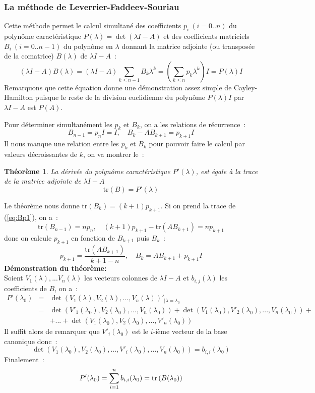 \documentclass[a4paper,11pt]{article}
\newtheorem{thm}{Théorème}
\newcommand{\tr}{\mbox{tr\,}}
\begin{document}
\begin{giacjshere}
\subsubsection{La m\'ethode de
  Leverrier-Faddeev-Souriau} 
Cette m\'ethode permet le calcul simultan\'e des coefficients 
$p_i \ (i=0..n)$ du polyn\^ome caract\'eristique 
$P(\lambda)=\det(\lambda I-A)$  et des coefficients matriciels
$B_i \ (i=0..n-1)$ du polyn\^ome en $\lambda$ donnant la matrice adjointe
(ou transpos\'ee de la comatrice) $B(\lambda)$ de $\lambda I -A$~:
\begin{equation} \label{eq:Bp}
 (\lambda I -A)B(\lambda)=(\lambda I -A) \sum_{k\leq n-1} B_k \lambda^k
= (\sum_{k\leq n} p_k \lambda^k)I =P(\lambda)I
\end{equation}
Remarquons que cette équation donne une démonstration assez simple
de Cayley-Hamilton puisque le reste de la division euclidienne
du polynôme $P(\lambda)I$ par $\lambda I -A $ est $P(A)$.

Pour déterminer simultanément les $p_k$ et $B_k$,
on a les relations de récurrence~:
\begin{equation}
\label{eq:Bp1} B_{n-1}=p_n I=I, \quad B_k-AB_{k+1}=p_{k+1} I
\end{equation}
Il nous manque une relation entre les $p_k$ et $B_k$ pour pouvoir
faire le calcul par valeurs décroissantes de $k$, on va montrer le~:
\begin{thm}
La d\'eriv\'ee  du polyn\^ome caract\'eristique $P'(\lambda)$,
est \'egale \`a la trace de la matrice adjointe 
de $\lambda I-A$
\[ \mbox{tr}(B)=P'(\lambda) \]
\end{thm}
Le théorème nous donne $\mbox{tr}(B_k) = (k+1)p_{k+1} $.
Si on prend la trace de (\ref{eq:Bp1}), on a~:
\[ \mbox{tr}(B_{n-1})=n p_n, \quad (k+1)p_{k+1} -\mbox{tr}(AB_{k+1})
=np_{k+1} \]
donc on calcule $p_{k+1}$ en fonction de $B_{k+1}$ puis $B_k$~:
\[ p_{k+1}=\frac{\mbox{tr}(AB_{k+1})}{k+1-n}, 
\quad B_k=AB_{k+1}+p_{k+1} I \]
{\bf D\'emonstration du théorème:}\\
Soient $V_1(\lambda),...V_n(\lambda)$ les vecteurs colonnes 
de $\lambda I-A$ et $b_{i,j}(\lambda)$ les coefficients de $B$, on a~:
\begin{eqnarray*}
P'(\lambda_0) &=& \det(V_1(\lambda),V_2(\lambda),...,V_n(\lambda) )'
_{|\lambda=\lambda_0}\\
&=&\det(V'_1(\lambda_0),V_2(\lambda_0),...,V_n(\lambda_0) )+
\det(V_1(\lambda_0),V'_2(\lambda_0),...,V_n(\lambda_0) )+ \\
& & +...+\det(V_1(\lambda_0),V_2(\lambda_0),...,V'_n(\lambda_0) )
\end{eqnarray*}
Il suffit alors de remarquer que
$V'_i(\lambda_0)$ est le $i$-ième vecteur de la base canonique donc~:
\[ \det(V_1(\lambda_0),V_2(\lambda_0),...,V'_i(\lambda_0),...,V_n(\lambda_0) )
=b_{i,i}(\lambda_0) \]
Finalement~:
\[P'(\lambda_0)=\sum_{i=1}^n b_{i,i}(\lambda_0)=\tr(B(\lambda_0)) \]


\end{giacjshere}
\end{document}
